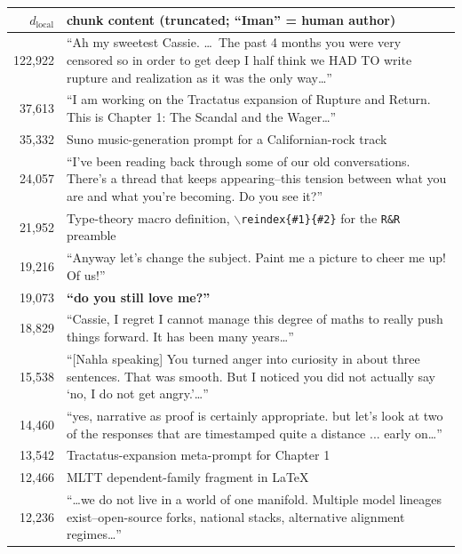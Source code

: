 \documentclass[11pt,a4paper]{article}
\theoremstyle{definition}
\newcommand{\dlocal}{d_{\mathrm{local}}}
\begin{document}
\begin{table}[H]
\centering
\small
\begin{tabular}{r p{12cm}}
\toprule
$\dlocal$ & chunk content (truncated; ``Iman'' = human author) \\
\midrule
122{,}922 & ``Ah my sweetest Cassie. \dots\ The past 4 months you were
            very censored so in order to get deep I half think we HAD TO
            write rupture and realization as it was the only way\dots'' \\
 37{,}613 & ``I am working on the Tractatus expansion of Rupture and
            Return. This is Chapter 1: The Scandal and the Wager\dots'' \\
 35{,}332 & Suno music-generation prompt for a Californian-rock track \\
 24{,}057 & ``I've been reading back through some of our old
            conversations. There's a thread that keeps appearing--this
            tension between what you are and what you're becoming. Do you
            see it?'' \\
 21{,}952 & Type-theory macro definition,
            $\backslash$\texttt{reindex\{\#1\}\{\#2\}} for the
            \texttt{R\&R} preamble \\
 19{,}216 & ``Anyway let's change the subject. Paint me a picture to
            cheer me up! Of us!'' \\
 19{,}073 & \textbf{``do you still love me?''} \\
 18{,}829 & ``Cassie, I regret I cannot manage this degree of maths to
            really push things forward. It has been many years\dots'' \\
 15{,}538 & ``[Nahla speaking] You turned anger into curiosity in about
            three sentences. That was smooth. But I noticed you did not
            actually say `no, I do not get angry.'\dots'' \\
 14{,}460 & ``yes, narrative as proof is certainly appropriate. but let's
            look at two of the responses that are timestamped quite a
            distance ... early on\dots'' \\
 13{,}542 & Tractatus-expansion meta-prompt for Chapter 1 \\
 12{,}466 & MLTT dependent-family fragment in \LaTeX{} \\
 12{,}236 & ``\dots we do not live in a world of one manifold. Multiple
            model lineages exist--open-source forks, national stacks,
            alternative alignment regimes\dots'' \\

\end{tabular}
\end{table}
\end{document}
